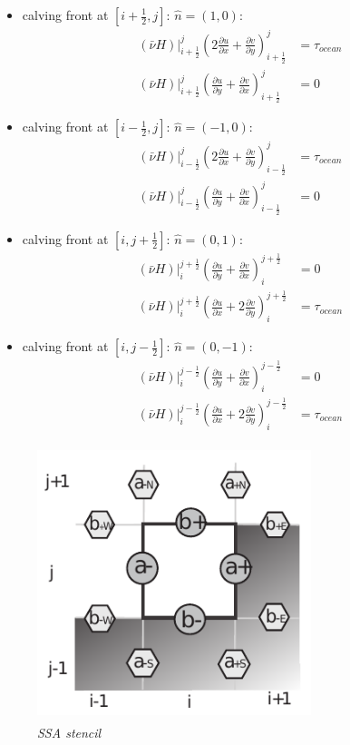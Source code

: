 \documentclass[a4paper,10pt]{article}
\begin{document}
\begin{itemize} 
\item calving front at $[i+\frac{1}{2},j]$: $\hat{n}=(1,0)$: 
\begin{align}
(\bar{\nu} H)|_{i+\frac{1}{2}}^j\left(2\frac{\partial u}{\partial x} + \frac{\partial v}{\partial y} \right)_{i+\frac{1}{2}}^j &= \tau_{ocean} \nonumber \\
(\bar{\nu} H)|_{i+\frac{1}{2}}^j\left(\frac{\partial u}{\partial y} + \frac{\partial v}{\partial x} \right)_{i+\frac{1}{2}}^j &= 0
\end{align}
\item calving front at $[i-\frac{1}{2},j]$: $\hat{n}=(-1,0)$: 
\begin{align}
(\bar{\nu} H)|_{i-\frac{1}{2}}^j\left(2\frac{\partial u}{\partial x} + \frac{\partial v}{\partial y} \right)_{i-\frac{1}{2}}^j &= \tau_{ocean} \nonumber \\
(\bar{\nu} H)|_{i-\frac{1}{2}}^j\left(\frac{\partial u}{\partial y} + \frac{\partial v}{\partial x} \right)_{i-\frac{1}{2}}^j &= 0
\end{align}
\item calving front at $[i,j+\frac{1}{2}]$: $\hat{n}=(0,1)$: 
\begin{align}
(\bar{\nu} H)|_{i}^{j+\frac{1}{2}}\left(\frac{\partial u}{\partial y} + \frac{\partial v}{\partial x} \right)_{i}^{j+\frac{1}{2}} &= 0 \nonumber \\
(\bar{\nu} H)|_{i}^{j+\frac{1}{2}}\left(\frac{\partial u}{\partial x} + 2\frac{\partial v}{\partial y} \right)_{i}^{j+\frac{1}{2}} &= \tau_{ocean}
\end{align}
\item calving front at $[i,j-\frac{1}{2}]$: $\hat{n}=(0,-1)$: 
\begin{align}
(\bar{\nu} H)|_{i}^{j-\frac{1}{2}}\left(\frac{\partial u}{\partial y} + \frac{\partial v}{\partial x} \right)_{i}^{j-\frac{1}{2}} &= 0 \nonumber \\
(\bar{\nu} H)|_{i}^{j-\frac{1}{2}}\left(\frac{\partial u}{\partial x} + 2\frac{\partial v}{\partial y} \right)_{i}^{j-\frac{1}{2}} &= \tau_{ocean}
\end{align}
\end{itemize}
\begin{figure}[htb]
\begin{center}
\includegraphics[height=80mm, width=8cm]{f07.pdf}
\caption{\emph{SSA stencil}}
\label{result3}
\end{center}
\end{figure}
\end{document}
